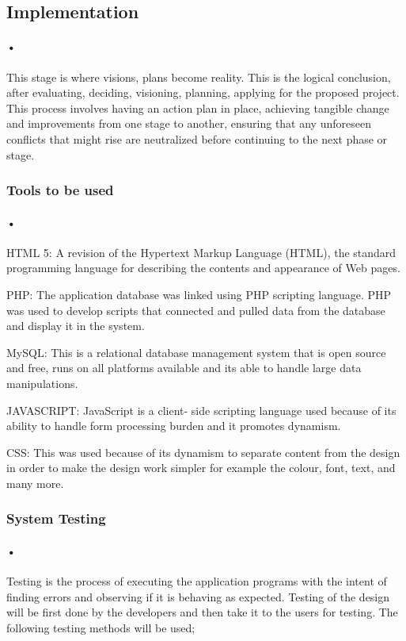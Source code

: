 \documentclass[12pt]{article}
\begin{document}
\subsection{Implementation}
\paragraph{•}This stage is where visions, plans become reality. This is the logical conclusion, after evaluating, deciding, visioning, planning, applying for the proposed project. This process involves having an action plan in place, achieving tangible change and improvements from one stage to another, ensuring that any unforeseen conflicts that might rise are neutralized before continuing to the next phase or stage.
\subsubsection{Tools to be used}

\paragraph{•} HTML 5:  A revision of the Hypertext Markup Language (HTML), the standard programming language for describing the contents and appearance of Web pages. 

PHP:  The application database was linked using PHP scripting language. PHP was used to develop scripts that connected and pulled data from the database and display it in the system. 

MySQL: This is a relational database management system that is open source and free, runs on all platforms available and its able to handle large data manipulations.

JAVASCRIPT: JavaScript is a client- side scripting language used because of its ability to handle form processing burden and it promotes dynamism.

CSS: This was used because of its dynamism to separate content from the design in order to make the design work simpler for example the colour, font, text, and many more.

\subsubsection{System Testing} 
\paragraph{•}Testing is the process of executing the application programs with the intent of finding errors and observing if it is behaving as expected. Testing of the design will be first done by the developers and then take it to the users for testing. The following testing methods will be used;
\end{document}
